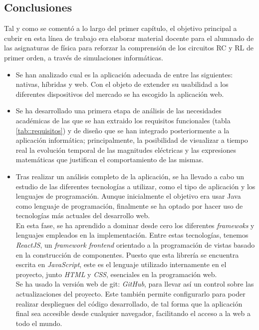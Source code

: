 \documentclass[../main.tex]{subfiles}
\begin{document}
\subsection{Conclusiones}
Tal y como se comentó a lo largo del primer capítulo, el objetivo principal a cubrir en esta línea de trabajo era elaborar material docente para el alumnado de las asignaturas de física para reforzar la comprensión de los circuitos RC y RL de primer orden, a través de simulaciones informáticas.





\begin{itemize}

    \item Se han analizado cual es la aplicación adecuada de entre las siguientes: nativas, híbridas y web. Con el objeto de extender su usabilidad a los diferentes dispositivos del mercado se ha escogido la aplicación web.

    \item Se ha desarrollado una primera etapa de análisis de las necesidades académicas de las que se han extraido los requisitos funcionales (tabla \ref{tab::requisitos}) y de diseño que se han integrado posteriormente a la aplicación informática; principalmente, la posibilidad de visualizar a tiempo real la evolución temporal de las magnitudes eléctricas y las expresiones matemáticas que justifican el comportamiento de las mismas.
    
    \item Tras realizar un análisis completo de la aplicación, se ha llevado a cabo un estudio de las diferentes tecnologías a utilizar, como el tipo de aplicación y los lenguajes de programación. Aunque inicialmente el objetivo era usar Java como lenguaje de programación, finalmente se ha optado por hacer uso de tecnologías más actuales del desarrollo web.\\
    
    En esta fase, se ha aprendido a dominar desde cero los diferentes \textit{framewoks} y lenguajes empleados en la implementación. Entre estas tecnologías, tenemos \textit{ReactJS}, un \textit{framework frontend} orientado a la programación de vistas basado en la construcción de componentes. Puesto que esta librería se encuentra escrita en \textit{JavaScript}, este es el lenguaje utilizado internamente en el proyecto, junto \textit{HTML} y \textit{CSS}, esenciales en la programación web.\\

    Se ha usado la versión web de git: \textit{GitHub}, para llevar así un control sobre las actualizaciones del proyecto. Este también permite configurarlo para poder realizar despliegues del código desarrollado, de tal forma que la aplicación final sea accesible desde cualquier navegador, facilitando el acceso a la web a todo el mundo.
    

\end{itemize}
\end{document}
